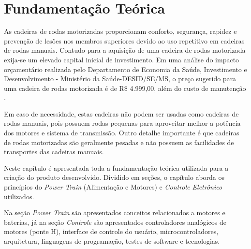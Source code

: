 \chapter{Fundamentação Teórica}
\label{cap:fundamentacao_teorica}

As cadeiras de rodas motorizadas proporcionam conforto, segurança, rapidez e prevenção de lesões nos membros superiores devido ao uso repetitivo em cadeiras de rodas manuais. Contudo para a aquisição de uma cadeira de rodas motorizada exija-se um elevado capital inicial de investimento. Em uma análise do impacto orçamentário realizada pelo Departamento de Economia da Saúde, Investimento e Desenvolvimento - Ministério da Saúde-DESID/SE/MS, o preço sugerido para uma cadeira de rodas motorizada é de R\$ 4.999,00, além do custo de manutenção \cite{relatorio_sus}.

Em caso de necessidade, estas cadeiras não podem ser usadas como cadeiras de rodas manuais, pois possuem rodas pequenas para aproveitar melhor a potência dos motores e sistema de transmissão. Outro detalhe importante é que cadeiras de rodas motorizadas são geralmente pesadas e não possuem as facilidades de transportes das cadeiras manuais.

Neste capítulo é apresentada toda a fundamentação teórica utilizada para a criação do produto desenvolvido. Dividido em seções, o capítulo aborda os princípios do \textit{Power Train} (Alimentação e Motores) e \textit{Controle Eletrônico} utilizados.

Na seção \textit{Power Train} são apresentados conceitos relacionados a motores e baterias, já na seção \textit{Controle} são apresentados controladores analógicos de motores (ponte H), interface de controle do usuário, microcontroladores, arquitetura, linguagens de programação, testes de software e tecnologias.

